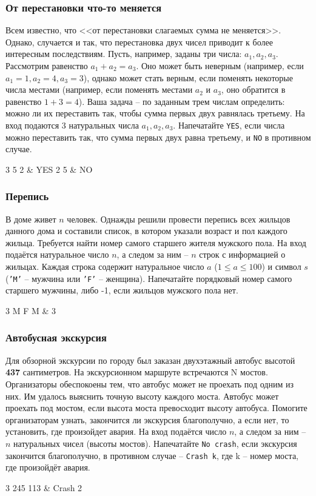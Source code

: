 \begin{frame}
	\frametitle{От перестановки что-то меняется}
	Всем известно, что <<от перестановки слагаемых сумма не меняется>>. Однако,
	случается и так, что перестановка двух чисел приводит к более интересным
	последствиям. Пусть, например, заданы три числа: $a_1, a_2, a_3$. Рассмотрим
	равенство $a_1 + a_2 = a_3$. Оно может быть неверным (например, если $a_1 = 1,
	a_2 = 4, a_3 = 3$), однако может стать верным, если поменять некоторые числа
	местами (например, если поменять местами $a_2$ и $a_3$, оно обратится в
	равенство $1 + 3 = 4$). Ваша задача -- по заданным трем числам определить:
	можно ли их переставить так, чтобы сумма первых двух равнялась третьему. 
	\inp
	На вход подаются 3 натуральных числа $a_1, a_2, a_3$.
	\out
	Напечатайте {\tt YES}, если числа можно переставить так, что сумма первых двух
	равна третьему, и {\tt NO} в противном случае.
	\begin{ex}
		3 5 2 & YES  2 5 & NO \tb
	\end{ex}
\end{frame}

\begin{frame}
	\frametitle{Перепись}
	В доме живет $n$ человек. Однажды решили провести перепись всех жильцов данного
	дома и составили список, в котором указали возраст и пол каждого жильца.
	Требуется найти номер самого старшего жителя мужского пола.
	\inp
	На вход подаётся натуральное число $n$, а следом за ним -- $n$ строк с
	информацией о жильцах. Каждая строка содержит натуральное число $a$ ($1 \leq a
	\leq 100$) и символ $s$ ({\tt'M'} -- мужчина или {\tt'F'} -- женщина).
	\out
	Напечатайте порядковый номер самого старшего мужчины, либо -1, если жильцов
	мужского пола нет.
	\begin{ex}
		3  M  F  M & 3 \tb
	\end{ex}
\end{frame}

\begin{frame}
	\frametitle{Автобусная экскурсия}
	Для обзорной экскурсии по городу был заказан двухэтажный автобус высотой {\bf
	437} сантиметров. На экскурсионном маршруте встречаются N мостов.
	Организаторы обеспокоены тем, что автобус может не проехать под одним из них.
	Им удалось выяснить точную высоту каждого моста. Автобус может проехать под
	мостом, если высота моста превосходит высоту автобуса. Помогите организаторам
	узнать, закончится ли экскурсия благополучно, а если нет, то установить, где
	произойдет авария.
	\inp
	На вход подаётся число $n$, а следом за ним -- $n$ натуральных чисел (высоты мостов).
	\out
	Напечатайте {\tt No crash}, если экскурсия закончится благополучно, в противном
	случае -- {\tt Crash k}, где k -- номер моста, где произойдёт авария.
	\begin{ex}
		3  245 113 & Crash 2 \tb
	\end{ex}
\end{frame}

